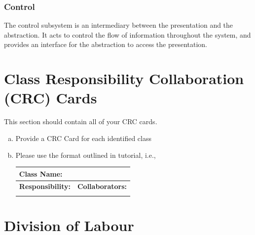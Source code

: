 \documentclass[]{article}
\begin{document}
\subsubsection{Control}

The control subsystem is an intermediary between the presentation and the
abstraction. It acts to control the flow of information throughout the system,
and provides an interface for the abstraction to access the presentation.


	
\section{Class Responsibility Collaboration (CRC) Cards}
\label{sec:class_responsibility_collaboration_crc_cards}
This section should contain all of your CRC cards.

\begin{enumerate}[a)]
	\item Provide a CRC Card for each identified class
	\item Please use the format outlined in tutorial, i.e., 
	\begin{table}[ht]
		\centering
		\begin{tabular}{|p{5cm}|p{5cm}|}
		\hline 
		 \multicolumn{2}{|l|}{\textbf{Class Name:}} \\
		\hline
		\textbf{Responsibility:} & \textbf{Collaborators:} \\
		\hline
		\vspace{1in} & \\
		\hline
		\end{tabular}
	\end{table}
	
\end{enumerate}

\appendix
\newpage
\section{Division of Labour}
\label{sec:division_of_labour}
\end{document}

